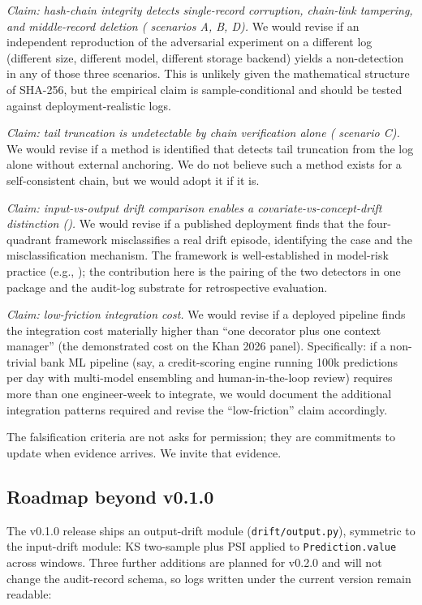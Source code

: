 \textit{Claim: hash-chain integrity detects single-record corruption, chain-link tampering, and middle-record deletion ( scenarios A, B, D).} We would revise if an independent reproduction of the adversarial experiment on a different log (different size, different model, different storage backend) yields a non-detection in any of those three scenarios. This is unlikely given the mathematical structure of SHA-256, but the empirical claim is sample-conditional and should be tested against deployment-realistic logs.

\textit{Claim: tail truncation is undetectable by chain verification alone ( scenario C).} We would revise if a method is identified that detects tail truncation from the log alone without external anchoring. We do not believe such a method exists for a self-consistent chain, but we would adopt it if it is.

\textit{Claim: input-vs-output drift comparison enables a covariate-vs-concept-drift distinction ().} We would revise if a published deployment finds that the four-quadrant framework misclassifies a real drift episode, identifying the case and the misclassification mechanism. The framework is well-established in model-risk practice (e.g., \citealp{KolmogorovSmirnov, PSI_Karakoulas}); the contribution here is the pairing of the two detectors in one package and the audit-log substrate for retrospective evaluation.

\textit{Claim: low-friction integration cost.} We would revise if a deployed pipeline finds the integration cost materially higher than ``one decorator plus one context manager'' (the demonstrated cost on the Khan 2026 panel). Specifically: if a non-trivial bank ML pipeline (say, a credit-scoring engine running 100k predictions per day with multi-model ensembling and human-in-the-loop review) requires more than one engineer-week to integrate, we would document the additional integration patterns required and revise the ``low-friction'' claim accordingly.

The falsification criteria are not asks for permission; they are commitments to update when evidence arrives. We invite that evidence.

\subsection{Roadmap beyond v0.1.0}\label{sec:future}

The v0.1.0 release ships an output-drift module (\texttt{drift/output.py}), symmetric to the input-drift module: KS two-sample plus PSI applied to \texttt{Prediction.value} across windows. Three further additions are planned for v0.2.0 and will not change the audit-record schema, so logs written under the current version remain readable:

